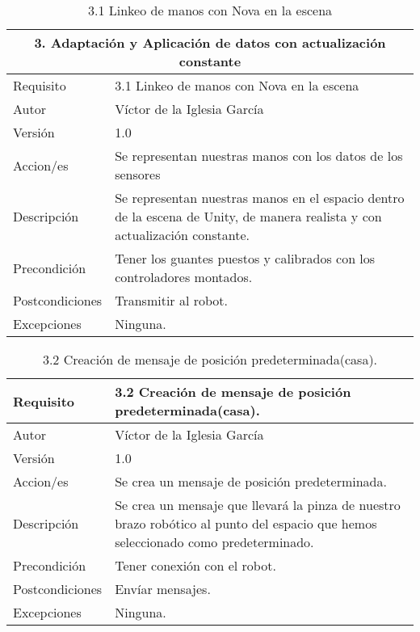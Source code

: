 \begin{table}[h]
    \centering
    \begin{tabular}{| m{3cm} | m{8cm} |}
    \hline
           \multicolumn{2}{|c|}{\textbf{3. Adaptación y Aplicación de datos con actualización constante}}                \\ \hline 
        Requisito & 3.1 Linkeo de manos con Nova en la escena\\ \hline
       Autor  &  Víctor de la Iglesia García \\ \hline
        Versión & 1.0 \\ \hline
        Accion/es & Se representan nuestras manos con los datos de los sensores\\ \hline
         Descripción & Se representan nuestras manos en el espacio dentro de la escena de Unity, de manera realista y con actualización constante. \\ \hline
        Precondición & Tener los guantes puestos y calibrados con los controladores montados. \\ \hline
        Postcondiciones & Transmitir al robot. \\ \hline
        Excepciones & Ninguna. \\ \hline
    \end{tabular}
    \caption{3.1 Linkeo de manos con Nova en la escena}
    \label{3.1 Linkeo de manos con Nova en la escena}
\end{table}

\begin{table}[h]
    \centering
    \begin{tabular}{| m{3cm} | m{8cm} |}
    \hline
        Requisito & 3.2 Creación de mensaje de posición predeterminada(casa).\\ \hline
       Autor  &  Víctor de la Iglesia García \\ \hline
        Versión & 1.0 \\ \hline
        Accion/es & Se crea un mensaje de posición predeterminada.\\ \hline
         Descripción & Se crea un mensaje que llevará la pinza de nuestro brazo robótico al punto del espacio que hemos seleccionado como predeterminado. \\ \hline
        Precondición & Tener conexión con el robot. \\ \hline
        Postcondiciones & Envíar mensajes. \\ \hline
        Excepciones & Ninguna. \\ \hline
    \end{tabular}
    \caption{3.2 Creación de mensaje de posición predeterminada(casa).}
    \label{3.2 Creación de mensaje de posición predeterminada(casa).}
\end{table}

